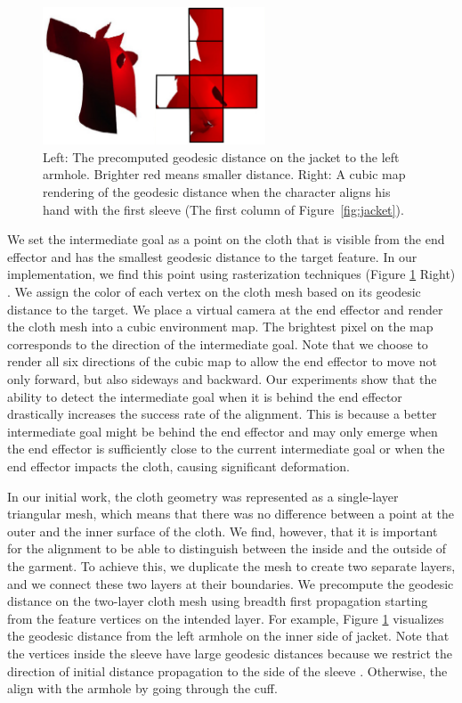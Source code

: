 \begin{figure}[!t]
  \centering
  \includegraphics[width=2.6in]{images/geodesic}
  \caption{Left: The precomputed geodesic distance on the jacket to the left armhole. Brighter red means smaller distance. Right: A cubic map rendering of the geodesic distance when the character aligns his hand with the first sleeve (The first column of Figure~\ref{fig:jacket}).}
  \label{fig:geodesic}
\end{figure}


We set the intermediate goal as a point on the cloth that is visible from
the end effector and has the smallest geodesic distance to the target
feature. In our implementation, we find this point using rasterization
techniques (Figure \ref{fig:geodesic} Right) . We assign the color of
each vertex on the cloth mesh based on its geodesic distance to the target. We
place a virtual camera at the end effector and render the cloth mesh into
a cubic environment map. The brightest pixel on the map corresponds to the
direction of the intermediate goal. Note that we choose to render all six
directions of the cubic map to allow the end effector to move not only
forward, but also sideways and backward. Our experiments show that the
ability to detect the intermediate goal when it is behind the end effector
drastically increases the success rate of the alignment. This is because a
better intermediate goal might be behind the end effector and may only
emerge when the end effector is sufficiently close to the current
intermediate goal or when the end effector impacts the cloth, causing
significant deformation.

In our initial work, the cloth geometry was represented as a single-layer triangular mesh, which means that there was no difference between a point at the outer and the inner surface of the cloth. We find, however, that it is important for the alignment to be able to distinguish between the inside and the outside of the garment.  To achieve this, we duplicate the mesh to create two separate layers, and we connect these two layers at their boundaries. We precompute the geodesic distance on the two-layer cloth mesh using breadth first propagation starting from the feature vertices on the intended layer. For example, Figure \ref{fig:geodesic} visualizes the geodesic distance from the left armhole on the inner side of jacket. Note that the vertices inside the sleeve have large geodesic distances because we restrict the direction of initial distance propagation to the side of the sleeve . Otherwise, the   align  with the armhole by going through the cuff.

